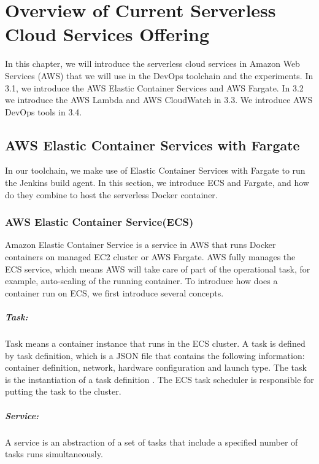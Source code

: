 \chapter{Overview of Current Serverless Cloud Services Offering}
In this chapter, we will introduce the serverless cloud services in Amazon Web Services (AWS) that we will use in the DevOps toolchain and the experiments.
 In 3.1, we introduce the AWS Elastic Container Services and AWS Fargate. In 3.2 we introduce the AWS Lambda and AWS CloudWatch in 3.3. We introduce AWS DevOps tools in 3.4.
\section{AWS Elastic Container Services with Fargate}
In our toolchain, we make use of Elastic Container Services with Fargate to run the Jenkins build agent. In this section, we introduce ECS and Fargate, and how do they combine to host the serverless Docker container.
\subsection{AWS Elastic Container Service(ECS)}
Amazon Elastic Container Service is a service in AWS that runs Docker containers on managed EC2 cluster or AWS Fargate. AWS fully manages the ECS service, which means AWS will take care of part of the operational task, for example, auto-scaling of the running container. To introduce how does a container run on ECS, we first introduce several concepts.
\paragraph{Task:} Task means a container instance that runs in the ECS cluster. A task is defined by task definition, which is a JSON file that contains the following information: container definition, network, hardware configuration and launch type. The task is the instantiation of a task definition \cite{WhatisAm71:online}. The ECS task scheduler is responsible for putting the task to the cluster. 
\paragraph{Service:} A service is an abstraction of a set of tasks that include a specified number of tasks runs simultaneously.
